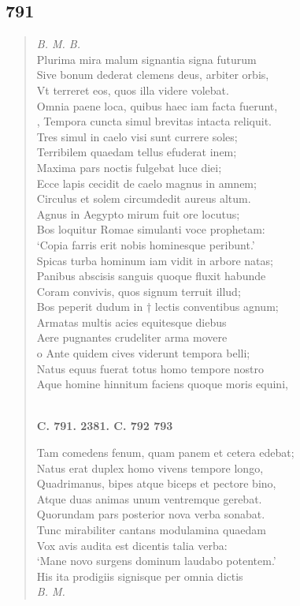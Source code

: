 \documentclass[11pt, a4paper]{report}
\begin{document}
            \subsection*{791}
      \begin{verse}
      \textit{B. M. B.} \\ Plurima mira malum signantia signa futurum \\ Sive bonum dederat clemens deus, arbiter orbis, \\ Vt terreret eos, quos illa videre volebat. \\ Omnia paene loca, quibus haec iam facta fuerunt, \\ , Tempora cuncta simul brevitas intacta reliquit. \\ Tres simul in caelo visi sunt currere soles; \\ Terribilem quaedam tellus efuderat inem; \\ Maxima pars noctis fulgebat luce diei; \\ Ecce lapis cecidit de caelo magnus in amnem; \\ Circulus et solem circumdedit aureus altum. \\ Agnus in Aegypto mirum fuit ore locutus; \\ Bos loquitur Romae simulanti voce prophetam: \\ ‘Copia farris erit nobis hominesque peribunt.’ \\ Spicas turba hominum iam vidit in arbore natas; \\ Panibus abscisis sanguis quoque fluxit habunde \\ Coram convivis, quos signum terruit illud; \\ Bos peperit dudum in † lectis conventibus agnum; \\ Armatas multis acies equitesque diebus \\ Aere pugnantes crudeliter arma movere \\ o Ante quidem cives viderunt tempora belli; \\ Natus equus fuerat totus homo tempore nostro \\ Aque homine hinnitum faciens quoque moris equini, \\ 
        ﻿\pagebreak 
    \begin{center} \textbf{C. 791. 2381. C. 792 793} \end{center} \marginpar{[270]} Tam comedens fenum, quam panem et cetera edebat; \\ Natus erat duplex homo vivens tempore longo, \\ Quadrimanus, bipes atque biceps et pectore bino, \\ Atque duas animas unum ventremque gerebat. \\ Quorundam pars posterior nova verba sonabat. \\ Tunc mirabiliter cantans modulamina quaedam \\ Vox avis audita est dicentis talia verba: \\ ‘Mane novo surgens dominum laudabo potentem.’ \\ His ita prodigiis signisque per omnia dictis \\ \textit{B. M.} \\ 

\end{verse}
\end{document}
